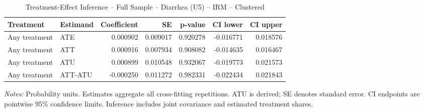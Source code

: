 \begin{table}[htbp]
\centering
\caption{Treatment-Effect Inference -- Full Sample -- Diarrhea (U5) -- IRM -- Clustered}
\label{tab:inference-diarrhea-IRM-clustered}
\scriptsize
\begin{adjustbox}{max width=\linewidth}
\begin{tabular}{llrrrrr}
\toprule
Treatment & Estimand & Coefficient & SE & p-value & CI lower & CI upper \\
\midrule
Any treatment & ATE & 0.000902 & 0.009017 & 0.920278 & -0.016771 & 0.018576 \\
Any treatment & ATT & 0.000916 & 0.007934 & 0.908082 & -0.014635 & 0.016467 \\
Any treatment & ATU & 0.000899 & 0.010548 & 0.932067 & -0.019773 & 0.021573 \\
Any treatment & ATT-ATU & -0.000250 & 0.011272 & 0.982331 & -0.022434 & 0.021843 \\
\bottomrule
\end{tabular}

\end{adjustbox}
\par\smallskip
\begin{minipage}{\linewidth}\scriptsize \textit{Notes:} Probability units. Estimates aggregate all cross-fitting repetitions. ATU is derived; SE denotes standard error. CI endpoints are pointwise 95\% confidence limits. Inference includes joint covariance and estimated treatment shares. \end{minipage}
\end{table}


